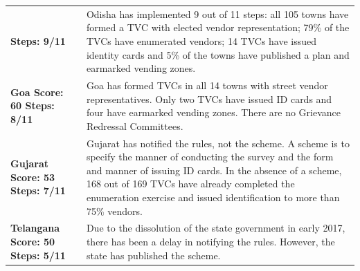 \documentclass[a4paper, 12pt, twoside]{article}
\begin{document}
{\begin{longtable}[l]{>{\raggedright}p{4cm}>{\raggedright\arraybackslash}p{10cm}}
\bf{Steps: 9/11}
&
\cellcolor{SVACgreen2}Odisha has implemented 9 out of 11 steps: all 105 towns have formed a TVC with elected vendor representation; 79\% of the TVCs have enumerated vendors; 14 TVCs have issued identity cards and 5\% of the towns have published a plan and earmarked vending zones.
\\
\cellcolor{SVACgreen3}\bf{Goa}
\newline
\bf{Score: 60}
\newline
\bf{Steps: 8/11}
&
\cellcolor{SVACgreen2}Goa has formed TVCs in all 14 towns with street vendor representatives. Only two TVCs have issued ID cards and four have earmarked vending zones. There are no Grievance Redressal Committees.
\\
\cellcolor{SVACgreen3}\bf{Gujarat}
\newline
\bf{Score: 53}
\newline
\bf{Steps: 7/11}
&
\cellcolor{SVACgreen2}Gujarat has notified the rules, not the scheme. A scheme is to specify the manner of conducting the survey and the form and manner of issuing ID cards. In the absence of a scheme, 168 out of 169 TVCs have already completed the enumeration exercise and issued identification to more than 75\% vendors.
\\
\cellcolor{SVACgreen3}\bf{Telangana}
\newline
\bf{Score: 50}
\newline
\bf{Steps: 5/11}
&
\cellcolor{SVACgreen2}Due to the dissolution of the state government in early 2017, there has been a delay in notifying the rules. However, the state has published the scheme.


\end{longtable}}
\end{document}
